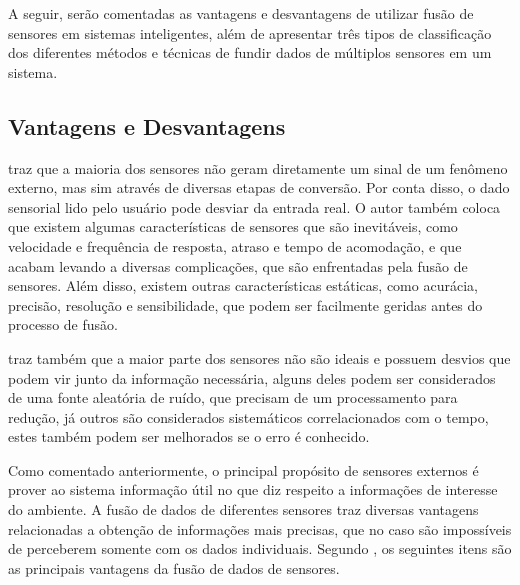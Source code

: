 \documentclass[acronym, symbols, table]{fei}
\begin{document}
		A seguir, serão comentadas as vantagens e desvantagens de utilizar fusão de sensores em sistemas inteligentes, além de apresentar três tipos de classificação dos diferentes métodos e técnicas de fundir dados de múltiplos sensores em um sistema.
		
		\subsection{Vantagens e Desvantagens}
		
			\textcite{fung2017sensor} traz que a maioria dos sensores não geram diretamente um sinal de um fenômeno externo, mas sim através de diversas etapas de conversão. Por conta disso, o dado sensorial lido pelo usuário pode desviar da entrada real. O autor também coloca que existem algumas características de sensores que são inevitáveis, como velocidade e frequência de resposta, atraso e tempo de acomodação, e que acabam levando a diversas complicações, que são enfrentadas pela fusão de sensores. Além disso, existem outras características estáticas, como acurácia, precisão, resolução e sensibilidade, que podem ser facilmente geridas antes do processo de fusão.
			
			\textcite{fung2017sensor} traz também que a maior parte dos sensores não são ideais e possuem desvios que podem vir junto da informação necessária, alguns deles podem ser considerados de uma fonte aleatória de ruído, que precisam de um processamento para redução, já outros são considerados sistemáticos correlacionados com o tempo, estes também podem ser melhorados se o erro é conhecido.
			
			Como comentado anteriormente, o principal propósito de sensores externos é prover ao sistema informação útil no que diz respeito a informações de interesse do ambiente. A fusão de dados de diferentes sensores traz diversas vantagens relacionadas a obtenção de informações mais precisas, que no caso são impossíveis de perceberem somente com os dados individuais. Segundo \textcite{alatise2020review}, os seguintes itens são as principais vantagens da fusão de dados de sensores.
			
\end{document}
